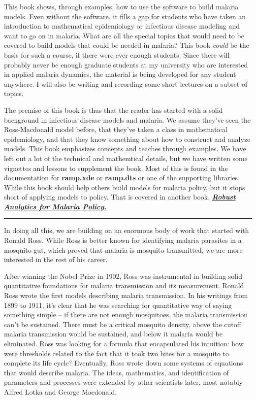 \documentclass[
]{book}
\begin{document}
This book shows, through examples, how to use the software to build malaria models.
Even without the software, it fills a gap for students who have taken an introduction to mathematical epidemiology or infectious disease modeling and want to go on in malaria.
What are all the special topics that would need to be covered to build models that could be needed in malaria?
This book \emph{could} be the basis for such a course, if there were ever enough students.
Since there will probably never be enough graduate students at my university who are interested in applied malaria dynamics, the material is being developed for any student anywhere.
I will also be writing and recording some short lectures on a subset of topics.

The premise of this book is thus that the reader has started with a solid background in infectious disease models and malaria. We assume they've seen the Ross-Macdonald model before, that they've taken a class in mathematical epidemiology, and that they know something about how to construct and analyze models. This book emphasizes concepts and teaches through examples. We have left out a lot of the technical and mathemtical details, but we have written some vignettes and lessons to supplement the book. Most of this is found in the documentation for \textbf{ramp.xde} or \textbf{ramp.dts} or one of the supporting libraries.\\

While this book should help others build models for malaria policy, but it stops short of applying models to policy. That is covered in another book, \href{../../RAMP-Book/_book/index.html}{\textbf{\emph{Robust Analytics for Malaria Policy}.}}

\begin{center}\rule{0.5\linewidth}{0.5pt}\end{center}

In doing all this, we are building on an enormous body of work that started with Ronald Ross. While Ross is better known for identifying malaria parasites in a mosquito gut, which proved that malaria is mosquito transmitted, we are more interested in the rest of his career.

After winning the Nobel Prize in 1902, Ross was instrumental in building solid quantitative foundations for malaria transmission and its measurement. Ronald Ross wrote the first models describing malaria transmission. In his writings from 1899 to 1911, it's clear that he was searching for quantitative way of saying something simple -- if there are not enough mosquitoes, the malaria transmission can't be sustained. There must be a critical mosquito density, above the cutoff malaria transmission would be sustained, and below it malaria would be eliminated. Ross was looking for a formula that encapsulated his intuition: how were thresholds related to the fact that it took two bites for a mosquito to complete its life cycle? Eventually, Ross wrote down some systems of equations that would describe malaria. The ideas, mathematics, and identification of parameters and processes were extended by other scientists later, most notably Alfred Lotka and George Macdonald.
\end{document}
